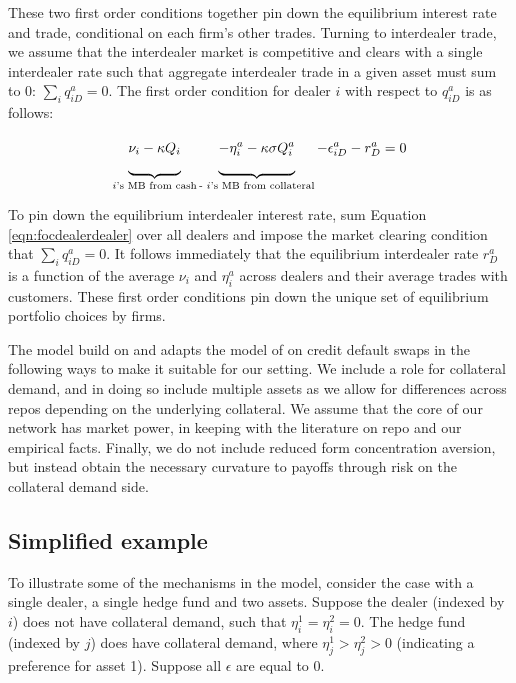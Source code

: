 These two first order conditions together pin down the equilibrium interest rate and trade, conditional on each firm's other trades. Turning to interdealer trade, we assume that the interdealer market is competitive and clears with a single interdealer rate such that aggregate interdealer trade in a given asset must sum to 0: $\sum_i q^a_{iD}=0$. The first order condition for dealer $i$ with respect to $q^a_{iD}$ is as follows:

\begin{equation}\label{eqn:focdealerdealer}
    \underbrace{\vphantom{\sum_m}\nu_{i}-\kappa Q_{i}}_\text{$i$'s MB from cash}\underbrace{-\eta^a_{i}-\kappa \sigma  Q^a_{i}\vphantom{\sum_m}}_\text{- $i$'s MB from collateral} -\epsilon^a_{iD}-r^a_{D}=0
\end{equation}

To pin down the equilibrium interdealer interest rate, sum Equation \ref{eqn:focdealerdealer} over all dealers and impose the market clearing condition that $\sum_i q^a_{iD}=0$. It follows immediately that the equilibrium interdealer rate $r^a_{D}$ is a function of the average $\nu_{i}$ and $\eta_i^a$ across dealers and their average trades with customers. These first order conditions pin down the unique set of equilibrium portfolio choices by firms.

The model build on and adapts the model of \cite{eisfeldt2023otc} on credit default swaps in the following ways to make it suitable for our setting. We include a role for collateral demand, and in doing so include multiple assets as we allow for differences across repos depending on the underlying collateral. We assume that the core of our network has market power, in keeping with the literature on repo \citep{eisenschmidt2022monetary, huber2023market} and our empirical facts. Finally, we do not include reduced form concentration aversion, but instead obtain the necessary curvature to payoffs through risk on the collateral demand side. 

\subsection{Simplified example}

To illustrate some of the mechanisms in the model, consider the case with a single dealer, a single hedge fund and two assets. Suppose the dealer (indexed by $i$) does not have collateral demand, such that $\eta^1_i=\eta^2_i=0$. The hedge fund (indexed by $j$) does have collateral demand, where $\eta^1_j>\eta^2_j>0$ (indicating a preference for asset 1). Suppose all $\epsilon$ are equal to 0. 

